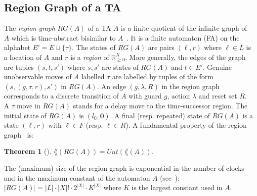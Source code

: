\documentclass[letterpaper,10pt,conference]{ieeeconf}  \IEEEoverridecommandlockouts                              \overrideIEEEmargins
\def\st{{s.t.}~}
\newcommand{\vect}[1]{\mathbf{#1}}
\newtheorem{theorem}{Theorem}
\newcommand{\setR}{\mathbb R}
\def\tauac{\tau}
\def\untimed{\textit{Unt}} \def\dta{DTA\xspace}
\def\rg{\textit{RG}}
\begin{document}
\subsection{Region Graph of a TA}
The \emph{region graph} $\rg(A)$ of a TA $A$ is a finite quotient of
the infinite graph of $A$ which is time-abstract bisimilar to
$A$~\cite{AlurDill94}.  It is a finite automaton (FA) on the alphabet
$E'= E \cup \{\tauac\}$. The states of $\rg(A)$ are pairs $(\ell,r)$
where $\ell \in L$ is a location of $A$ and $r$ is a \emph{region} of
$\setR_{\geq 0}^X$. More generally, the edges of the graph are tuples
$(s,t,s')$ where $s,s'$ are states of $\rg(A)$ and $t \in E'$.
Genuine unobservable moves of $A$ labelled $\tauac$ are labelled by
tuples of the form $(s,(g,\tauac,r),s')$ in $\rg(A)$.
An edge $(g,\lambda,R)$ in the region graph corresponds to a discrete
transition of $A$ with guard $g$, action $\lambda$ and reset set $R$.
A $\tauac$ move in $\rg(A)$ stands for a delay move to the
time-successor region.  The initial state of $\rg(A)$ is
$(l_0,\vect{0})$.  A final (resp. repeated) state of $\rg(A)$ is a
state $(\ell,r)$ with $\ell \in F$ (resp. $\ell \in R$).  A
fundamental property of the region graph~\cite{AlurDill94} is:
\begin{theorem}[\cite{AlurDill94}] \label{thm-alur}
  $\lang(\rg(A))=\untimed(\lang(A))$. 
\end{theorem}
\iffalse
In other words:
  \begin{enumerate}
  \item if $w$ is accepted by $\rg(A)$, then there is a timed word $v$
    with $\untimed(v)=w$ \st $v$ is accepted by $A$.
  \item if $v$ is accepted by $A$, then $\untimed(w)$ is accepted
    $\rg(A)$.
  \end{enumerate}
\fi
  The (maximum) size of the region graph is exponential in the number
  of clocks and in the maximum constant of the automaton $A$
  (see~\cite{AlurDill94}): $|\rg(A)|=|L|\cdot |X|! \cdot 2^{|X|} \cdot
  K^{|X|}$ where $K$ is the largest constant used in $A$.
\end{document}

